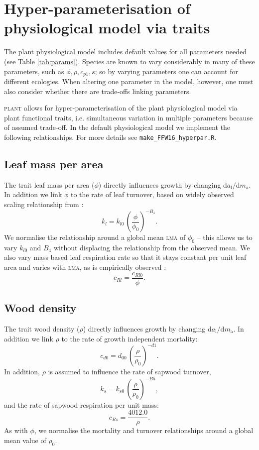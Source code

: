 \documentclass[10pt,twoside]{article}
\newcommand{\plant}{\textsc{plant}}
\begin{document}
\section{Hyper-parameterisation of physiological model via
traits}\label{traits}

The plant physiological model includes default values for all parameters needed 
(see Table \ref{tab:params}). Species are known to vary considerably
in many of these parameters, such as $\phi,\rho,c_{p1},s$; so by varying  parameters
one can account for different ecologies. When altering one parameter in the model, however,
one must also consider whether there are trade-offs linking parameters. 

{\plant} allows for
hyper-parameterisation of the plant physiological model via plant functional traits, i.e. 
simultaneous variation in multiple parameters because of assumed trade-off. In the 
default physiological model we implement the following relationships. For more 
details see \texttt{make\_FFW16\_hyperpar.R}.

\subsection{Leaf mass per area}

The trait leaf mass per area ($\phi$) directly influences growth by changing 
$\textrm{d}a_\textrm{l} / \textrm{d}m_\textrm{a}$. In addition we  
link $\phi$ to the rate of leaf turnover,
based on widely observed scaling relationship from \citet{Wright-2004}:
$$k_l=k_{l0} \, \left(\frac{\phi}{\phi_0}\right)^{-B_4}.$$
We normalise the relationship around a global mean \textsc{lma} of $\phi_0$ -- this
allows us to vary $k_{l0}$ and $B_4$ without displacing the relationship from the 
observed mean. 
We also vary mass based leaf respiration rate so that it stays constant per unit leaf area and
varies with \textsc{lma}, as is empirically observed \citet{Wright-2004}:
$$c_{Rl}= \frac{c_{Rl0}}{\phi}.$$

\subsection{Wood density}

The trait wood density ($\rho$) directly influences growth by changing 
$\textrm{d}a_\textrm{l} / \textrm{d}m_\textrm{a}$.  In addition we  
link $\rho$ to the rate of growth independent mortality:
$$c_{d0}=d_{00} \, \left(\frac{\rho}{\rho_0}\right) ^ {-d1}.$$
In addition, $\rho$ is assumed to influence the rate of sapwood turnover, 
$$k_s=k_{s0} \, \left(\frac{\rho}{\rho_0}\right)^ {-B5},$$
and the rate of sapwood respiration per unit mass:
$$c_{Rs} = \frac{4012.0}{\rho}.$$
As with $\phi$, we normalise the mortality and turnover 
relationships around a global mean value of $\rho_0$. 
\end{document}
